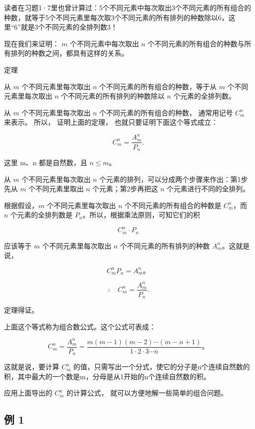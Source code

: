 读者在习题1·7里也曾计算过：5个不同元素中每次取出3个不同元素的所有组合的种数，就等于5个不同元素里每次取3个不同元素的所有排列的种数除以6，这里``6''就是3个不同元素的全排列数3！

现在我们来证明： \(m\) 个不同元素中每次取出 \(n\)
个不同元素的所有组合的种数与所有排列的种数之间，都具有这样的关系。

定理

从 \(m\) 个不同元素里每次取出 \(n\) 个不同元素的所有组合的种数，等于从
\(m\) 个不同元素里每次取出 \(n\) 个不同元素的所有排列的种数除以 \(n\)
个元素的全排列数。

从 \(m\) 个不同元素里每次取出 \(n\) 个不同元素的所有组合的种数，
通常用记号 \(C_{m}^{n}\) 来表示。 所以， 证明上面的定理，
也就只要证明下面这个等式成立：

\[
C _ {m} ^ {n} = \frac {A _ {m} ^ {n}}{P _ {n}}.
\]

这里 m、n 都是自然数，且 \(n \leqslant m\)。

 从 \(m\) 个不同元素里每次取出 \(n\)
个元素的排列，可以分成两个步骤来作出：第1步先从 \(m\) 个不同元素里取出
\(n\) 个元素；第2步再把这 \(n\) 个元素进行不同的全排列。

根据假设，\(m\) 个不同元素里每次取出 \(n\) 个不同元素的所有组合的种数是
\(C_m^n\)，而 \(n\) 个元素的全排列数是
\(P_n\)。所以，根据乘法原则，可知它们的积

\[
C _ {m} ^ {n} \cdot P _ {n}
\]

应该等于 \(m\) 个不同元素里每次取出 \(n\) 个不同元素的所有排列的种数
\(A_{m}^{n}\)。这就是说，

\[
C_m^nP_n=A_m^n\text{。}
\]

\[
\therefore \quad C _ {m} ^ {n} = \frac {A _ {m} ^ {n}}{P _ {n}}.
\]

定理得证。

上面这个等式称为组合数公式。这个公式可表成：

\[
C_m^n=\frac{A_m^n}{P_n}=\frac{m(m-1)(m-2)\cdots(m-n+1)}{1\cdot2\cdot3\cdots n}\text{。}
\]

这就是说，要计算 \(C_{m}^{n}\)
的值，只需写出一个分式，使它的分子是n个连续自然数的积，其中最大的一个数是m，分母是从1开始的n个连续自然数的积。

应用上面导出的 \(C_{m}^{n}\) 的计算公式，
就可以方便地解一些简单的组合问题。

\subsection{例 1}

